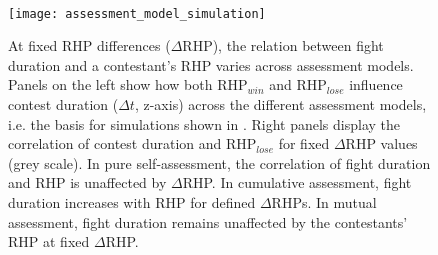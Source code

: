 \begin{figure}[t]
  \begin{minipage}[t]{0.66\textwidth}
    \mbox{}\\
    \texttt{[image: assessment\_model\_simulation]}
  \end{minipage}\hfill
  \begin{minipage}[t]{0.3\textwidth}
    \caption{\label{assessment_sim} At fixed RHP differences ($\Delta$RHP), the relation between fight duration and a contestant's RHP varies across assessment models. Panels on the left show how both RHP$_{win}$ and RHP$_{lose}$ influence contest duration ($\Delta t$, z-axis) across the different assessment models, i.e. the basis for simulations shown in . Right panels display the correlation of contest duration and RHP$_{lose}$ for fixed $\Delta$RHP values (grey scale).  In pure self-assessment, the correlation of fight duration and RHP is unaffected by $\Delta$RHP.  In cumulative assessment, fight duration increases with RHP for defined $\Delta$RHPs.  In mutual assessment, fight duration remains unaffected by the contestants' RHP at fixed $\Delta$RHP.}
  \end{minipage}
\end{figure}


